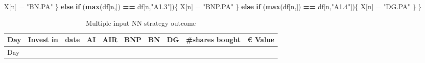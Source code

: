 \documentclass[
  11pt,
]{article}
\newenvironment{Shaded}{\begin{snugshade}}{\end{snugshade}}
\newcommand{\ControlFlowTok}[1]{\textcolor[rgb]{0.13,0.29,0.53}{\textbf{#1}}}
\newcommand{\KeywordTok}[1]{\textcolor[rgb]{0.13,0.29,0.53}{\textbf{#1}}}
\newcommand{\NormalTok}[1]{#1}
\newcommand{\OperatorTok}[1]{\textcolor[rgb]{0.81,0.36,0.00}{\textbf{#1}}}
\newcommand{\StringTok}[1]{\textcolor[rgb]{0.31,0.60,0.02}{#1}}
\begin{document}
\begin{Shaded}
\begin{Highlighting}[]
\NormalTok{    X[n] =}\StringTok{ "BN.PA"}
\NormalTok{  \} }\ControlFlowTok{else} \ControlFlowTok{if}\NormalTok{ (}\KeywordTok{max}\NormalTok{(df[n,]) }\OperatorTok{==}\StringTok{ }\NormalTok{df[n,}\StringTok{"A1.3"}\NormalTok{])\{}
\NormalTok{    X[n] =}\StringTok{ "BNP.PA"}
\NormalTok{  \} }\ControlFlowTok{else} \ControlFlowTok{if}\NormalTok{ (}\KeywordTok{max}\NormalTok{(df[n,]) }\OperatorTok{==}\StringTok{ }\NormalTok{df[n,}\StringTok{"A1.4"}\NormalTok{])\{}
\NormalTok{    X[n] =}\StringTok{ "DG.PA"}
\NormalTok{  \}}
\NormalTok{\}}
\end{Highlighting}
\end{Shaded}

\begin{longtable}[]{@{}llllllllll@{}}
\caption{Multiple-input NN strategy outcome}\tabularnewline
\toprule
\begin{minipage}[b]{0.04\columnwidth}\raggedright
Day\strut
\end{minipage} & \begin{minipage}[b]{0.09\columnwidth}\raggedright
Invest in\strut
\end{minipage} & \begin{minipage}[b]{0.10\columnwidth}\raggedright
date\strut
\end{minipage} & \begin{minipage}[b]{0.06\columnwidth}\raggedright
AI\strut
\end{minipage} & \begin{minipage}[b]{0.06\columnwidth}\raggedright
AIR\strut
\end{minipage} & \begin{minipage}[b]{0.06\columnwidth}\raggedright
BNP\strut
\end{minipage} & \begin{minipage}[b]{0.06\columnwidth}\raggedright
BN\strut
\end{minipage} & \begin{minipage}[b]{0.06\columnwidth}\raggedright
DG\strut
\end{minipage} & \begin{minipage}[b]{0.13\columnwidth}\raggedright
\#shares bought\strut
\end{minipage} & \begin{minipage}[b]{0.08\columnwidth}\raggedright
€ Value\strut
\end{minipage}\tabularnewline
\midrule
\endfirsthead
\toprule
\begin{minipage}[b]{0.04\columnwidth}\raggedright
Day\strut
\end{minipage} & \begin{minipage}[b]{0.09\columnwidth}\raggedright

\end{minipage}
\end{longtable}
\end{document}

